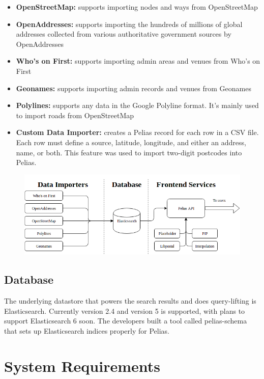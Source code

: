 \begin{itemize}
\item \textbf{OpenStreetMap:} supports importing nodes and ways from OpenStreetMap
\item \textbf{OpenAddresses:} supports importing the hundreds of millions of global addresses collected from various authoritative government sources by OpenAddresses
\item \textbf{Who's on First:} supports importing admin areas and venues from Who's on First
\item \textbf{Geonames:} supports importing admin records and venues from Geonames
\item \textbf{Polylines:} supports any data in the Google Polyline format. It's mainly used to import roads from OpenStreetMap
\item \textbf{Custom Data Importer:} creates a Pelias record for each row in a CSV file. Each row must define a source, latitude, longitude, and either an address, name, or both. This feature was used to import two-digit postcodes into Pelias.
\end{itemize}

\begin{figure}[H]
\centering
\includegraphics[width=1.0\textwidth]{img/pelias_architecture}
\label{fig:pelias_architecture}
\end{figure}

\subsection{Database}
The underlying datastore that powers the search results and does query-lifting is Elasticsearch. Currently version 2.4 and version 5 is supported, with plans to support Elasticsearch 6 soon. The developers built a tool called pelias-schema that sets up Elasticsearch indices properly for Pelias.

\section{System Requirements}
